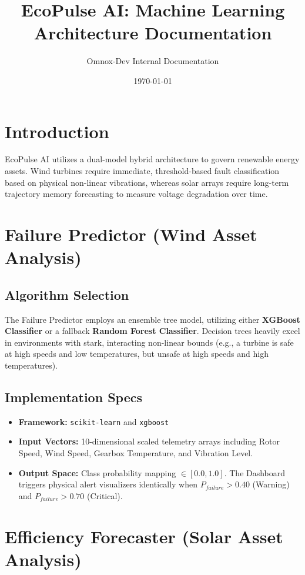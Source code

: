 \documentclass[11pt, a4paper]{article}
\title{\textbf{EcoPulse AI: Machine Learning Architecture Documentation}}
\author{Omnox-Dev Internal Documentation}
\date{\today}
\begin{document}
\maketitle

\section{Introduction}
EcoPulse AI utilizes a dual-model hybrid architecture to govern renewable energy assets. Wind turbines require immediate, threshold-based fault classification based on physical non-linear vibrations, whereas solar arrays require long-term trajectory memory forecasting to measure voltage degradation over time. 

\section{Failure Predictor (Wind Asset Analysis)}
\subsection{Algorithm Selection}
The Failure Predictor employs an ensemble tree model, utilizing either \textbf{XGBoost Classifier} or a fallback \textbf{Random Forest Classifier}. 
Decision trees heavily excel in environments with stark, interacting non-linear bounds (e.g., a turbine is safe at high speeds and low temperatures, but unsafe at high speeds and high temperatures).

\subsection{Implementation Specs}
\begin{itemize}
    \item \textbf{Framework:} \texttt{scikit-learn} and \texttt{xgboost}
    \item \textbf{Input Vectors:} 10-dimensional scaled telemetry arrays including Rotor Speed, Wind Speed, Gearbox Temperature, and Vibration Level.
    \item \textbf{Output Space:} Class probability mapping $\in [0.0, 1.0]$. The Dashboard triggers physical alert visualizers identically when $P_{failure} > 0.40$ (Warning) and $P_{failure} > 0.70$ (Critical).
\end{itemize}

\section{Efficiency Forecaster (Solar Asset Analysis)}
\end{document}
